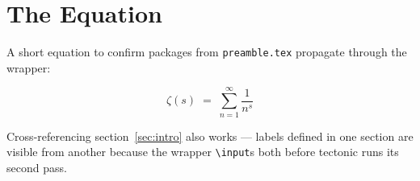 \section{The Equation}
\label{sec:body}

A short equation to confirm packages from \texttt{preamble.tex}
propagate through the wrapper:

\begin{equation}
  \zeta(s) \;=\; \sum_{n=1}^{\infty} \frac{1}{n^{s}}
\end{equation}

Cross-referencing section~\ref{sec:intro} also works — labels
defined in one section are visible from another because the
wrapper \texttt{\textbackslash{}input}s both before tectonic
runs its second pass.
